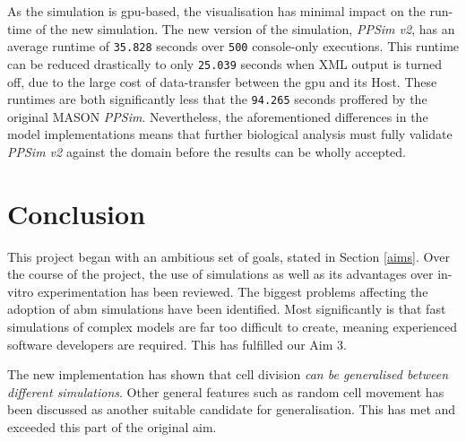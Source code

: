 \documentclass{UoYCSproject}
\begin{document}
As the simulation is \gls{gpu}-based, the visualisation has minimal impact on the run-time of the new simulation.
The new version of the simulation, \textit{PPSim v2}, has an average runtime of \texttt{35.828} seconds over \texttt{500} console-only executions.
This runtime can be reduced drastically to only \texttt{25.039} seconds when XML output is turned off, due to the large cost of data-transfer between the \gls{gpu} and its \gls{Host}.
These runtimes are both significantly less that the \texttt{94.265} seconds proffered by the original \gls{MASON} \textit{PPSim}.
Nevertheless, the aforementioned differences in the model implementations means that further biological analysis must fully validate \textit{PPSim v2} against the \gls{domain} before the results can be wholly accepted.

\chapter{Conclusion}
This project began with an ambitious set of goals, stated in Section \ref{aims}.
Over the course of the project, the use of simulations as well as its advantages over \gls{in-vitro} experimentation has been reviewed.
The biggest problems affecting the adoption of \gls{abm} simulations have been identified.
Most significantly is that fast simulations of complex models are far too difficult to create, meaning experienced software developers are required.
This has fulfilled our Aim 3.

The new implementation has shown that cell division \textit{can be generalised between different simulations}.
Other general features such as random cell movement has been discussed as another suitable candidate for generalisation.
This has met and exceeded this part of the original aim.
\end{document}
